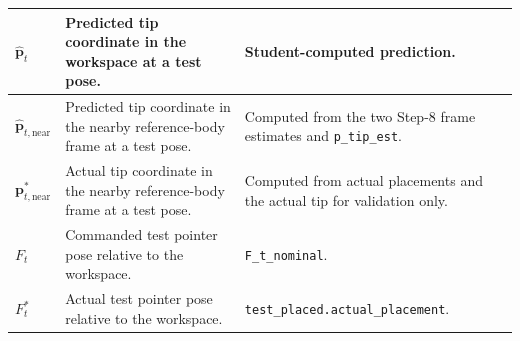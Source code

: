 \documentclass[11pt]{article}
\newcommand{\vct}[1]{\bm{#1}}
\begin{document}
\begin{longtable}{p{}p{}p{}}
$\widehat{\vct{p}}_t$ & Predicted tip coordinate in the workspace at a test pose. & Student-computed prediction. \\\midrule
$\widehat{\vct{p}}_{t,\mathrm{near}}$ & Predicted tip coordinate in the nearby reference-body frame at a test pose. & Computed from the two Step-8 frame estimates and \texttt{p\_tip\_est}. \\\midrule
$\vct{p}_{t,\mathrm{near}}^*$ & Actual tip coordinate in the nearby reference-body frame at a test pose. & Computed from actual placements and the actual tip for validation only. \\\midrule
$F_t$ & Commanded test pointer pose relative to the workspace. & \texttt{F\_t\_nominal}. \\\midrule
$F_t^*$ & Actual test pointer pose relative to the workspace. & \texttt{test\_placed.actual\_placement}. \\
\bottomrule
\end{longtable}
\endgroup
\end{document}
